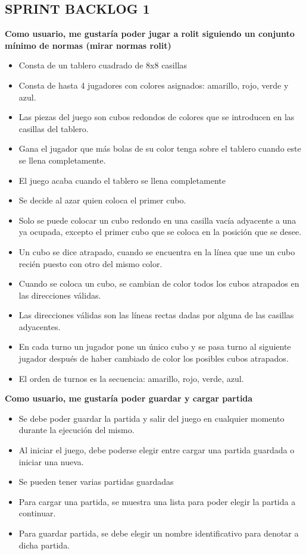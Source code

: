 \documentclass{article}
\begin{document}
\subsection{SPRINT BACKLOG 1}\label{sprint-backlog-1}

\textbf{Como usuario, me gustaría poder jugar a rolit siguiendo un
conjunto mínimo de normas (mirar normas rolit)}

\begin{itemize}
\item
  Consta de un tablero cuadrado de 8x8 casillas
\item
  Consta de hasta 4 jugadores con colores asignados: amarillo, rojo,
  verde y azul.
\item
  Las piezas del juego son cubos redondos de colores que se introducen
  en las casillas del tablero.
\item
  Gana el jugador que más bolas de su color tenga sobre el tablero
  cuando este se llena completamente.
\item
  El juego acaba cuando el tablero se llena completamente
\item
  Se decide al azar quien coloca el primer cubo.
\item
  Solo se puede colocar un cubo redondo en una casilla vacía adyacente a
  una ya ocupada, excepto el primer cubo que se coloca en la posición
  que se desee.
\item
  Un cubo se dice atrapado, cuando se encuentra en la línea que une un
  cubo recién puesto con otro del mismo color.
\item
  Cuando se coloca un cubo, se cambian de color todos los cubos
  atrapados en las direcciones válidas.
\item
  Las direcciones válidas son las líneas rectas dadas por alguna de las
  casillas adyacentes.
\item
  En cada turno un jugador pone un único cubo y se pasa turno al
  siguiente jugador después de haber cambiado de color los posibles
  cubos atrapados.
\item
  El orden de turnos es la secuencia: amarillo, rojo, verde, azul.
\end{itemize}

\textbf{Como usuario, me gustaría poder guardar y cargar partida}

\begin{itemize}
\item
  Se debe poder guardar la partida y salir del juego en cualquier
  momento durante la ejecución del mismo.
\item
  Al iniciar el juego, debe poderse elegir entre cargar una partida
  guardada o iniciar una nueva.
\item
  Se pueden tener varias partidas guardadas
\item
  Para cargar una partida, se muestra una lista para poder elegir la
  partida a continuar.
\item
  Para guardar partida, se debe elegir un nombre identificativo para
  denotar a dicha partida.
\end{itemize}
\end{document}
